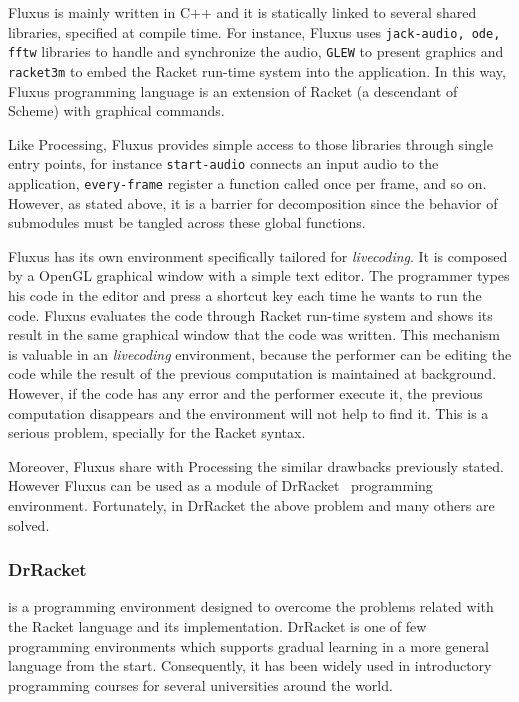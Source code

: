 Fluxus is mainly written in C++ and it is statically linked to several shared libraries, specified at compile time. For instance, Fluxus uses \texttt{jack-audio, ode, fftw} libraries to handle and synchronize the audio, \texttt{GLEW} to present graphics and \texttt{racket3m} to embed the Racket run-time system into the application. In this way, Fluxus programming language is an extension of Racket (a descendant of Scheme) with graphical commands. 

Like Processing, Fluxus provides simple access to those libraries through single entry points, for instance \texttt{start-audio} connects an input audio to the application, \texttt{every-frame} register a function called once per frame, and so on. However, as stated above, it is a barrier for decomposition since the behavior of submodules must be tangled across these global functions.

Fluxus has its own environment specifically tailored for \textit{livecoding}. It is composed by a OpenGL graphical window with a simple text editor. The programmer types his code in the editor and press a shortcut key each time he wants to run the code. Fluxus evaluates the code through Racket run-time system and shows its result in the same graphical window that the code was written. This mechanism is valuable in an \textit{livecoding} environment, because the performer can be editing the code while the result of the previous computation is maintained at background. However, if the code has any error and the performer execute it, the previous computation disappears and the environment will not help to find it. This is a serious problem, specially for the Racket syntax.

Moreover, Fluxus share with Processing the similar drawbacks previously stated. However Fluxus can be used as a module of DrRacket~\cite{findler2002drscheme} programming environment. Fortunately, in DrRacket the above problem and many others are solved.
\subsubsection{DrRacket~\cite{findler2002drscheme}} is a programming environment designed to overcome the problems related with the Racket language and its implementation. DrRacket is one of few programming environments which supports gradual learning in a more general language from the start. Consequently, it has been widely used in introductory programming courses for several universities around the world.

